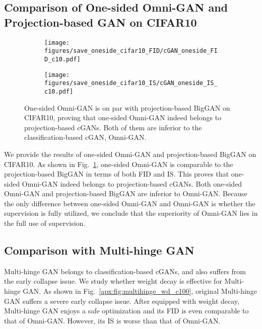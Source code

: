 \documentclass[paper_2425.tex]{subfiles}
\begin{document}
\subsection{Comparison of One-sided Omni-GAN and Projection-based GAN on CIFAR10}
\label{apx:sec:one_side}

\begin{figure}[!t]
  \begin{subfigure}{0.49\linewidth}
    \centering
\texttt{[image: figures/save\_oneside\_cifar10\_FID/cGAN\_oneside\_FID\_c10.pdf]}
\caption{}
\end{subfigure}
  \begin{subfigure}{0.49\linewidth}
    \centering
\texttt{[image: figures/save\_oneside\_cifar10\_IS/cGAN\_oneside\_IS\_c10.pdf]}
\caption{}
\end{subfigure}
  \caption{One-sided Omni-GAN is on par with projection-based BigGAN on CIFAR10, proving that one-sided Omni-GAN indeed belongs to projection-based cGANs. Both of them are inferior to the classification-based cGAN, Omni-GAN.}
  \label{apx:fig:oneside_c10}
\end{figure}

We provide the results of one-sided Omni-GAN and projection-based BigGAN on CIFAR10. As shown in Fig.~\ref{apx:fig:oneside_c10}, one-sided Omni-GAN is comparable to the projection-based BigGAN in terms of both FID and IS. This proves that one-sided Omni-GAN indeed belongs to projection-based cGANs. Both one-sided Omni-GAN and projection-based BigGAN are inferior to Omni-GAN. Because the only difference between one-sided Omni-GAN and Omni-GAN is whether the supervision is fully utilized, we conclude that the superiority of Omni-GAN lies in the full use of supervision.


\subsection{Comparison with Multi-hinge GAN}
\label{sec:comparison_multihinge}

Multi-hinge GAN belongs to classification-based cGANs, and also suffers from the early collapse issue. We study whether weight decay is effective for Multi-hinge GAN. As shown in Fig.~\ref{apx:fig:multihinge_wd_c100}, original Multi-hinge GAN suffers a severe early collapse issue. After equipped with weight decay, Multi-hinge GAN enjoys a safe optimization and its FID is even comparable to that of Omni-GAN. However, its IS is worse than that of Omni-GAN.
\end{document}
